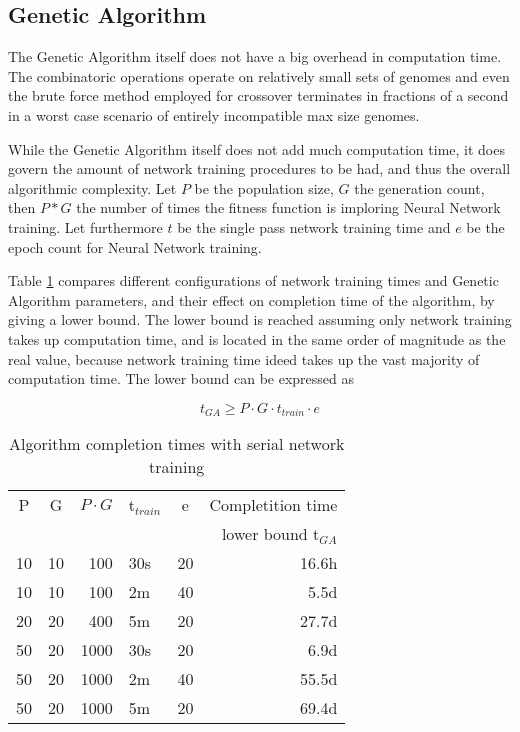 \documentclass[11pt,a4paper,twoside,openright]{scrbook}
\begin{document}
\subsection{Genetic Algorithm}
The Genetic Algorithm itself does not have a big overhead in computation time. The combinatoric operations operate on relatively small sets of genomes and even the brute force method employed for crossover terminates in fractions of a second in a worst case scenario of entirely incompatible max size genomes.

While the Genetic Algorithm itself does not add much computation time, it does govern the amount of network training procedures to be had, and thus the overall algorithmic complexity. Let \(P\) be the population size, \(G\) the generation count, then \(P * G\) the number of times the fitness function is imploring Neural Network training. Let furthermore \(t\) be the single pass network training time and \(e\) be the epoch count for Neural Network training.

Table \ref{table:gatimes} compares different configurations of network training times and Genetic Algorithm parameters, and their effect on completion time of the algorithm, by giving a lower bound. The lower bound is reached assuming only network training takes up computation time, and is located in the same order of magnitude as the real value, because network training time ideed takes up the vast majority of computation time. The lower bound can be expressed as

\vspace{0.6cm}
\begin{equation}
  t_{GA} \geq P \cdot G \cdot t_{train} \cdot e
\end{equation}
\vspace{0.6cm}

\begin{table}[h]
  \begin{center}
  \begin{tabular}{| c | c | r | l | c || r |}
    \hline
    P & G & \(P \cdot G\) & t\(_{train}\) & e & Completition time\\
    & & & & & lower bound t\(_{GA}\) \\
    \hline
    10 & 10 & 100 & 30s & 20 & 16.6h \\
    10 & 10 & 100 & 2m & 40 & 5.5d \\
    20 & 20 & 400 & 5m & 20 & 27.7d \\
    50 & 20 & 1000 & 30s & 20 & 6.9d \\
    50 & 20 & 1000 & 2m & 40 & 55.5d \\
    50 & 20 & 1000 & 5m & 20 & 69.4d \\
    \hline

  \end{tabular}
\end{center}
\caption{Algorithm completion times with serial network training}
 \label{table:gatimes}
\end{table}
\end{document}
